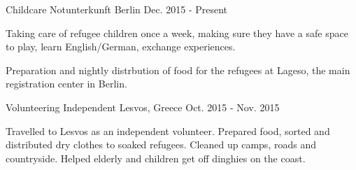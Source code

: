 

\begin{cventries}

  \cventry
    {Childcare} %
    {Notunterkunft} %
    {Berlin} %
    {Dec. 2015 - Present} %
    {
      \begin{cvitems} %
        \item Taking care of refugee children once a week, making sure they have a
        safe space to play, learn English/German, exchange experiences.
        \item Preparation and nightly distrbution of food for the refugees at Lageso, the
          main registration center in Berlin.
      \end{cvitems}
    }

  \cventry
    {Volunteering} %
    {Independent} %
    {Lesvos, Greece} %
    {Oct. 2015 - Nov. 2015} %
    {
      \begin{cvitems} %
        Travelled to Lesvos as an independent volunteer. Prepared food, sorted
        and distributed dry clothes to soaked refugees. Cleaned up camps, roads
        and countryside. Helped elderly and children get off dinghies on the coast.
      \end{cvitems}
    }

\end{cventries}

